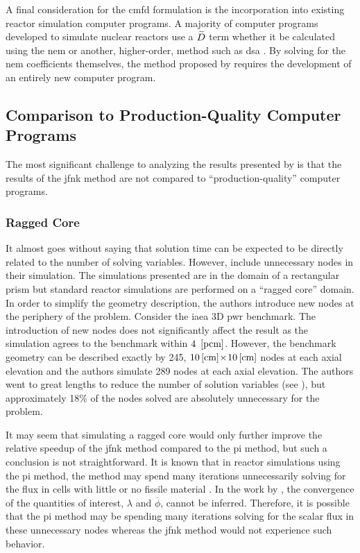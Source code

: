    A final consideration for the \gls{cmfd} formulation is the incorporation
    into existing reactor simulation computer programs. A majority of computer
    programs developed to simulate nuclear reactors use a $\widetilde{D}$ term whether
    it be calculated using the \gls{nem} or another, higher-order, method such
    as \gls{dsa} \cite{casmo4,simulate3,mpact}. By solving for the \gls{nem}
    coefficients themselves, the method proposed by \citeauthor{qe2paper}
    requires the development of an entirely new computer program.

  \subsection{Comparison to Production-Quality Computer Programs}

    The most significant challenge to analyzing the results presented by
    \citeauthor{qe2paper} is that the results of the \gls{jfnk} method are not
    compared to ``production-quality'' computer programs. 
    
    \subsubsection{Ragged Core}

      It almost goes without saying that solution time can be expected to be
      directly related to the number of solving variables. However,
      \citeauthor{qe2paper} include unnecessary nodes in their simulation. The
      simulations presented are in the domain of a rectangular prism but
      standard reactor simulations are performed on a ``ragged core'' domain. In
      order to simplify the geometry description, the authors introduce new
      nodes at the periphery of the problem. Consider the \gls{iaea} 3D
      \gls{pwr} benchmark. The introduction of new nodes does not significantly
      affect the result as the simulation agrees to the benchmark within
      $4~\left[\text{{pcm}}\right]$. However, the benchmark geometry can be described exactly
      by 245, $10\left[\text{{cm}}\right] \! \times \! 10\left[\text{{cm}}\right]$ nodes at each axial
      elevation and the authors simulate 289 nodes at each axial elevation. The
      authors went to great lengths to reduce the number of solution variables
      (see ), but approximately 18\% of the nodes
      solved are absolutely unnecessary for the problem.

      It may seem that simulating a ragged core would only further improve the
      relative speedup of the \gls{jfnk} method compared to the \gls{pi} method,
      but such a conclusion is not straightforward. It is known that in reactor
      simulations using the \gls{pi} method, the method may spend many
      iterations unnecessarily solving for the flux in cells with little or no
      fissile material \cite{gehinThesis}. In the work by \citeauthor{qe2paper},
      the convergence of the quantities of interest, $\lambda$ and
      $\overline{\phi}$, cannot be inferred. Therefore, it is possible that the
      \gls{pi} method may be spending many iterations solving for the scalar
      flux in these unnecessary nodes whereas the \gls{jfnk} method would not
      experience such behavior.

